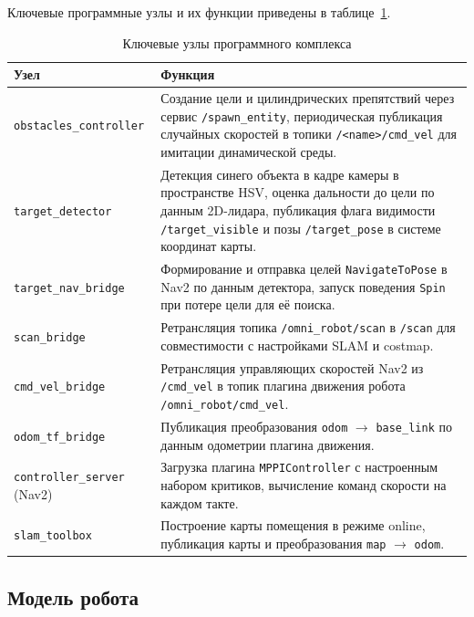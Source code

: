 Ключевые программные узлы и их функции приведены в
таблице~\ref{tab:nodes}.

\begin{table}[H]
\caption{Ключевые узлы программного комплекса}\label{tab:nodes}
\centering
\small
\begin{tabularx}{\textwidth}{|>{\raggedright\arraybackslash}p{}|>{\raggedright\arraybackslash}X|}
\hline
\textbf{Узел} & \textbf{Функция} \\
\hline
\texttt{obstacles\_controller} & Создание цели и цилиндрических препятствий через сервис \texttt{/spawn\_entity}, периодическая публикация случайных скоростей в топики \texttt{/\textless{}name\textgreater/cmd\_vel} для имитации динамической среды. \\
\hline
\texttt{target\_detector} & Детекция синего объекта в кадре камеры в пространстве HSV, оценка дальности до цели по данным 2D-лидара, публикация флага видимости \texttt{/target\_visible} и позы \texttt{/target\_pose} в системе координат карты. \\
\hline
\texttt{target\_nav\_bridge} & Формирование и отправка целей \texttt{NavigateToPose} в Nav2 по данным детектора, запуск поведения \texttt{Spin} при потере цели для её поиска. \\
\hline
\texttt{scan\_bridge} & Ретрансляция топика \texttt{/omni\_robot/scan} в \texttt{/scan} для совместимости с настройками SLAM и costmap. \\
\hline
\texttt{cmd\_vel\_bridge} & Ретрансляция управляющих скоростей Nav2 из \texttt{/cmd\_vel} в топик плагина движения робота \texttt{/omni\_robot/cmd\_vel}. \\
\hline
\texttt{odom\_tf\_bridge} & Публикация преобразования \texttt{odom} $\to$ \texttt{base\_link} по данным одометрии плагина движения. \\
\hline
\texttt{controller\_server} (Nav2) & Загрузка плагина \texttt{MPPIController} с настроенным набором критиков, вычисление команд скорости на каждом такте. \\
\hline
\texttt{slam\_toolbox} & Построение карты помещения в режиме online, публикация карты и преобразования \texttt{map} $\to$ \texttt{odom}. \\
\hline
\end{tabularx}
\end{table}

\subsection{Модель робота}

